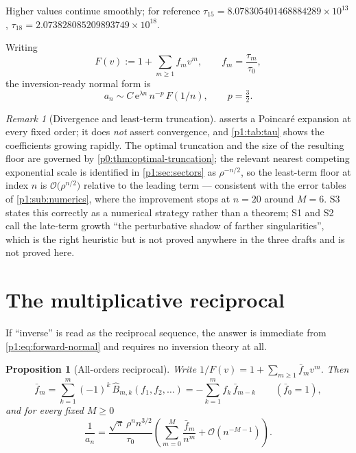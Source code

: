 \documentclass[11pt,a4paper,oneside]{book}
\theoremstyle{plain}
\newtheorem{proposition}[theorem]{Proposition}
\theoremstyle{definition}
\theoremstyle{remark}
\newtheorem{remark}[theorem]{Remark}
\newcommand{\e}{\mathrm{e}}
\newcommand{\bigO}{\mathcal{O}}
\newcommand{\OB}{\widehat{B}}
\begin{document}
Higher values continue smoothly; for reference $\tau_{15}=8.078305401468884289\times10^{13}$,
$\tau_{18}=2.073828085209893749\times10^{18}$.

Writing
\begin{equation}
 F(v):=1+\sum_{m\ge1}f_mv^{m},\qquad f_m=\frac{\tau_m}{\tau_0},
 \label{p1:eq:F-def}
\end{equation}
the inversion-ready normal form is
\begin{equation}
 \boxed{\;a_n\sim C\,\e^{\lambda n}\,n^{-p}\,F(1/n),
 \qquad p=\tfrac32 .\;}
 \label{p1:eq:forward-normal}
\end{equation}

\begin{remark}[Divergence and least-term truncation]
\label{p1:rem:divergence}
 asserts a Poincar\'e expansion at every fixed order; it does \emph{not}
assert convergence, and \cref{p1:tab:tau} shows the coefficients growing rapidly.  The optimal
truncation and the size of the resulting floor are governed by
\cref{p0:thm:optimal-truncation}; the relevant nearest competing exponential scale is
identified in \cref{p1:sec:sectors} as $\rho^{-n/2}$, so the least-term floor at index $n$ is
$\bigO\bigl(\rho^{n/2}\bigr)$ relative to the leading term --- consistent with the error
tables of \cref{p1:sub:numerics}, where the improvement stops at $n=20$ around $M=6$.
\textsf{S3} states this correctly as a numerical strategy rather than a theorem; \textsf{S1}
and \textsf{S2} call the late-term growth ``the perturbative shadow of farther
singularities'', which is the right heuristic but is not proved anywhere in the three drafts
and is not proved here.
\end{remark}

\section{The multiplicative reciprocal}
\label{p1:sec:reciprocal}

If ``inverse'' is read as the reciprocal sequence, the answer is immediate from
\cref{p1:eq:forward-normal} and requires no inversion theory at all.

\begin{proposition}[All-orders reciprocal]
\label{p1:prop:reciprocal}
Write $1/F(v)=1+\sum_{m\ge1}\bar f_mv^{m}$.  Then
\begin{equation}
 \bar f_m=\sum_{k=1}^{m}(-1)^{k}\,\OB_{m,k}(f_1,f_2,\ldots)
 =-\sum_{k=1}^{m}f_k\,\bar f_{m-k}\qquad(\bar f_0=1),
 \label{p1:eq:recip-coeff}
\end{equation}
and for every fixed $M\ge0$
\begin{equation}
 \frac1{a_n}=\frac{\sqrt\pi\,\rho^{n}n^{3/2}}{\tau_0}
 \left(\sum_{m=0}^{M}\frac{\bar f_m}{n^{m}}+\bigO(n^{-M-1})\right).
 \label{p1:eq:recip-asymptotic}
\end{equation}
\end{proposition}
\end{document}
